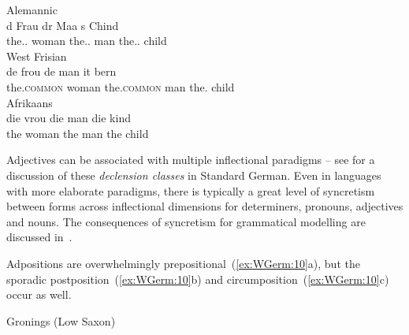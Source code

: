\documentclass[output=paper,hidelinks]{langscibook}
\begin{document}
\begin{exe}
  \ex \label{ex:WGerm:9}
  \begin{xlist}
    \ex Alemannic\\
        {\gll d Frau \hspace{2.25em} dr Maa \hspace{2.25em} s Chind\\
              the.\F.\NOM{} woman {} the.\M.\NOM{} man {} the.\N.\NOM{} child\\}
    \ex West Frisian\\
    {\gll de frou \hspace{1.225em} de man \hspace{1.4em} it bern\\
         the.\textsc{common} woman {} the.\textsc{common} man {} the.\N{} child\\} 
    \ex Afrikaans\\
        {\gll die vrou  \hspace{4.96875em} die man  \hspace{5.1875em} die kind\\
          the woman {} the man {} the child\\}
  \end{xlist}
\end{exe}

Adjectives can be associated with multiple inflectional paradigms --
see  for a discussion of these
\textit{declension classes} in Standard German.  Even in languages
with more elaborate paradigms, there is typically a great level of
syncretism between forms across inflectional dimensions for
determiners, pronouns, adjectives and nouns. The consequences of
syncretism for grammatical modelling are discussed
in~.

Adpositions are overwhelmingly prepositional~(\ref{ex:WGerm:10}a), but the sporadic
postposition~(\ref{ex:WGerm:10}b) and circumposition~(\ref{ex:WGerm:10}c) occur as well.
%
\begin{exe}
  \ex\label{ex:WGerm:10} Gronings (Low Saxon)
  \begin{xlist}
  \end{xlist}
\end{exe}
\end{document}
